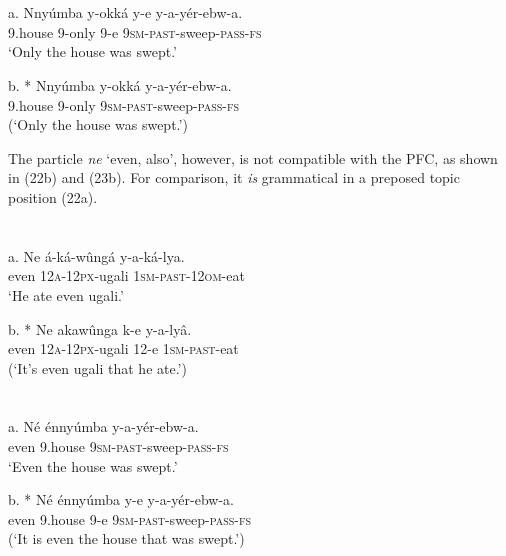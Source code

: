\documentclass[output=paper]{langsci/langscibook}
\begin{document}
\chapter[  ]{  }
\gll   a.  Nnyúmba  y-okká  y-e  y-a-yér-ebw-a.\\
         9.house  9-only  9-e  \textsc{9sm}{}-\textsc{past}{}-sweep-\textsc{pass}{}-\textsc{fs}\\
\glt     ‘Only the house was swept.’
\z

\gll   b.  * Nnyúmba  y-okká    y-a-yér-ebw-a.\\
         9.house  9-only    \textsc{9sm}{}-\textsc{past}{}-sweep-\textsc{pass}{}-\textsc{fs}\\
\glt     (‘Only the house was swept.’)
\z

The particle \textit{ne} ‘even, also’, however, is not compatible with the PFC, as shown in (22b) and (23b). For comparison, it \textit{is} grammatical in a preposed topic position (22a).

\chapter[  ]{  }
\gll   a.  Ne  á-ká-wûngá    y-a-ká-lya.\\
         even  \textsc{12a}{}-\textsc{12px}{}-ugali  \textsc{1sm}{}-\textsc{past}{}-\textsc{12om}{}-eat\\
\glt     ‘He ate even ugali.’
\z

\gll   b.  * Ne  akawûnga    k-e  y-a-lyâ.\\
         even  \textsc{12a}{}-\textsc{12px}{}-ugali  12-e  \textsc{1sm}{}-\textsc{past}{}-eat\\
\glt     (‘It’s even ugali that he ate.’)
\z

\chapter[  ]{  }
\gll   a.  Né  énnyúmba  y-a-yér-ebw-a.\\
         even  9.house  \textsc{9sm}{}-\textsc{past}{}-sweep-\textsc{pass}{}-\textsc{fs}\\
\glt     ‘Even the house was swept.’
\z

\gll   b.  * Né  énnyúmba  y-e  y-a-yér-ebw-a.\\
         even  9.house  9-e  \textsc{9sm}{}-\textsc{past}{}-sweep-\textsc{pass}{}-\textsc{fs}\\
\glt     (‘It is even the house that was swept.’)
\z
\end{document}
